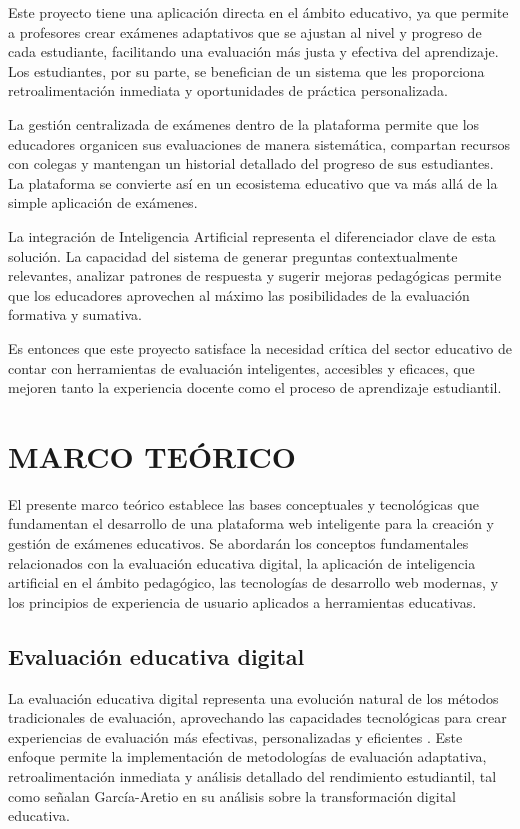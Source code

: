 \documentclass[12pt,a4paper]{report}
\begin{document}
Este proyecto tiene una aplicación directa en el ámbito educativo, ya que permite a profesores crear exámenes adaptativos que se ajustan al nivel y progreso de cada estudiante, facilitando una evaluación más justa y efectiva del aprendizaje. Los estudiantes, por su parte, se benefician de un sistema que les proporciona retroalimentación inmediata y oportunidades de práctica personalizada.

La gestión centralizada de exámenes dentro de la plataforma permite que los educadores organicen sus evaluaciones de manera sistemática, compartan recursos con colegas y mantengan un historial detallado del progreso de sus estudiantes. La plataforma se convierte así en un ecosistema educativo que va más allá de la simple aplicación de exámenes.

La integración de Inteligencia Artificial representa el diferenciador clave de esta solución. La capacidad del sistema de generar preguntas contextualmente relevantes, analizar patrones de respuesta y sugerir mejoras pedagógicas permite que los educadores aprovechen al máximo las posibilidades de la evaluación formativa y sumativa.

Es entonces que este proyecto satisface la necesidad crítica del sector educativo de contar con herramientas de evaluación inteligentes, accesibles y eficaces, que mejoren tanto la experiencia docente como el proceso de aprendizaje estudiantil.

\chapter{MARCO TEÓRICO}

El presente marco teórico establece las bases conceptuales y tecnológicas que fundamentan el desarrollo de una plataforma web inteligente para la creación y gestión de exámenes educativos. Se abordarán los conceptos fundamentales relacionados con la evaluación educativa digital, la aplicación de inteligencia artificial en el ámbito pedagógico, las tecnologías de desarrollo web modernas, y los principios de experiencia de usuario aplicados a herramientas educativas.

\section{Evaluación educativa digital}

La evaluación educativa digital representa una evolución natural de los métodos tradicionales de evaluación, aprovechando las capacidades tecnológicas para crear experiencias de evaluación más efectivas, personalizadas y eficientes \citep{cabrera2020}. Este enfoque permite la implementación de metodologías de evaluación adaptativa, retroalimentación inmediata y análisis detallado del rendimiento estudiantil, tal como señalan García-Aretio \citep{garcia2021} en su análisis sobre la transformación digital educativa.
\end{document}
